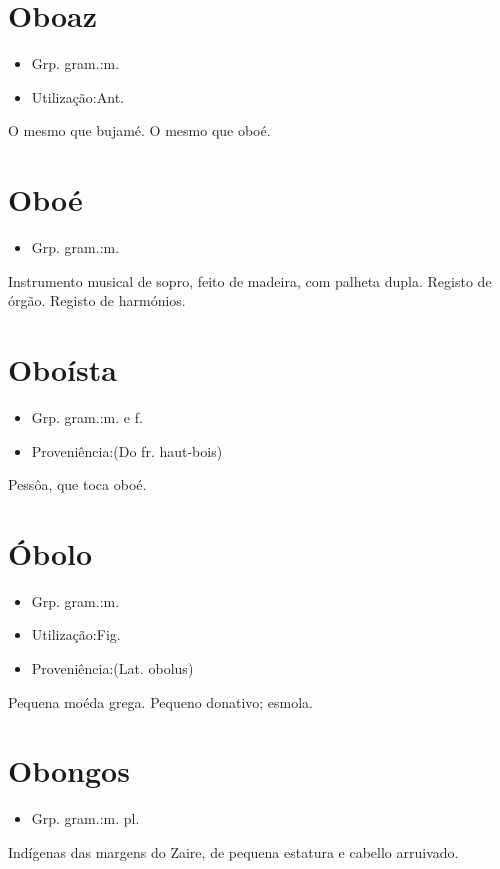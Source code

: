 \section{Oboaz}
\begin{itemize}
\item {Grp. gram.:m.}
\end{itemize}
\begin{itemize}
\item {Utilização:Ant.}
\end{itemize}
O mesmo que \textunderscore bujamé\textunderscore .
O mesmo que \textunderscore oboé\textunderscore .
\section{Oboé}
\begin{itemize}
\item {Grp. gram.:m.}
\end{itemize}
Instrumento musical de sopro, feito de madeira, com palheta dupla.
Registo de órgão.
Registo de harmónios.
\section{Oboísta}
\begin{itemize}
\item {Grp. gram.:m.  e  f.}
\end{itemize}
\begin{itemize}
\item {Proveniência:(Do fr. \textunderscore haut-bois\textunderscore )}
\end{itemize}
Pessôa, que toca oboé.
\section{Óbolo}
\begin{itemize}
\item {Grp. gram.:m.}
\end{itemize}
\begin{itemize}
\item {Utilização:Fig.}
\end{itemize}
\begin{itemize}
\item {Proveniência:(Lat. \textunderscore obolus\textunderscore )}
\end{itemize}
Pequena moéda grega.
Pequeno donativo; esmola.
\section{Obongos}
\begin{itemize}
\item {Grp. gram.:m. pl.}
\end{itemize}
Indígenas das margens do Zaire, de pequena estatura e cabello arruivado.

